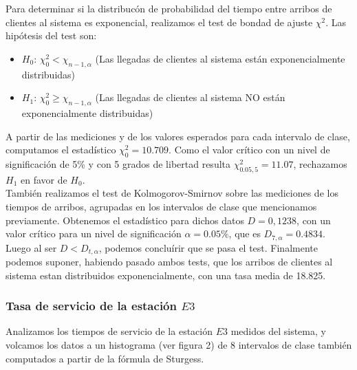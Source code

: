 \documentclass{article}
\numberwithin{equation}{section}
\numberwithin{figure}{section}
\numberwithin{table}{section}
\begin{document}
Para determinar si la distribuc\'on de probabilidad del tiempo entre arribos
de clientes al sistema es exponencial, realizamos el test de bondad de ajuste
$\chi^2$. Las hip\'otesis del test son:

\begin{itemize}
 \item {$H_{0}$:} $\chi_{0}^2 < \chi_{n-1,\alpha}$ (Las llegadas de clientes al sistema est\'an exponencialmente distribuidas)
 \item {$H_{1}$:} $\chi_{0}^2 \ge \chi_{n-1,\alpha}$ (Las llegadas de clientes al sistema NO est\'an exponencialmente distribuidas)
\end{itemize}

A partir de las mediciones y de los valores esperados para cada
intervalo de clase, computamos el estad\'istico $\chi_{0}^2 = 10.709$. Como el valor
cr\'itico con un nivel de significaci\'on de 5\% y con 5 grados de libertad resulta 
$\chi_{0.05,5}^2 = 11.07$, rechazamos $H_1$ en favor de $H_0$.\\
Tambi\'en realizamos el test de Kolmogorov-Smirnov sobre las mediciones de los tiempos de arribos, agrupadas en los intervalos 
de clase que mencionamos previamente. Obtenemos el estad\'istico para dichos datos $D =  0,1238$, con un valor cr\'itico para un nivel
de significaci\'on $\alpha = 0.05 \% $, que es  $D_{7,\alpha} = 0.4834$. Luego al ser $D < D_{t, \alpha }$, podemos conclu\'irir que se pasa el test.
Finalmente podemos suponer, habiendo pasado ambos tests, que los arribos de clientes al sistema estan distribuidos exponencialmente, con una tasa media de 18.825.

\subsubsection*{Tasa de servicio de la estaci\'on $E3$}
Analizamos los tiempos de servicio de la estaci\'on $E3$ medidos del sistema, y volcamos
los datos a un histograma (ver figura 2) de 8 intervalos de clase tambi\'en computados
a partir de la f\'ormula de Sturgess.
\end{document}
